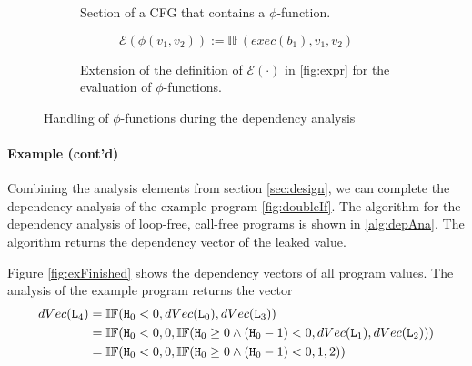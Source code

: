 \begin{figure}
\begin{subfigure}[t]{.4\textwidth}
    \centering
    \caption{Section of a CFG that contains a $\phi$-function.}
    \label{fig:phi}
\end{subfigure}
\hfill
\begin{subfigure}[t]{.5\textwidth}
    \begin{equation*}
\mathcal{E}(\phi(v_1, v_2)) := \mathbb{IF}(exec(b_1), v_1, v_2)
\end{equation*}
\caption{Extension of the definition of $\mathcal{E}(\cdot)$ in \ref{fig:expr} for the evaluation of $\phi$-functions.}\label{fig:exprPhi}
\end{subfigure}
\caption{Handling of $\phi$-functions during the dependency analysis}
\end{figure}

\paragraph{Example (cont'd)}
Combining the analysis elements from section \ref{sec:design}, we can complete the dependency analysis of the example program \ref{fig:doubleIf}. The algorithm for the dependency analysis of loop-free, call-free programs is shown in \ref{alg:depAna}. The algorithm returns the dependency vector of the leaked value.

Figure \ref{fig:exFinished} shows the dependency vectors of all program values. The analysis of the example program returns the vector
\begin{align*}
    dVec(\mathtt{L}_4) &= \mathbb{IF}(\mathtt{H}_0 < 0, dVec(\mathtt{L}_0), dVec(\mathtt{L}_3)) \\
    &= \mathbb{IF}(\mathtt{H}_0 < 0, 0, \mathbb{IF}(\mathtt{H}_0 \geq 0 \land (\mathtt{H}_0 - 1) < 0, dVec(\mathtt{L}_1), dVec(\mathtt{L}_2))) \\
    &= \mathbb{IF}(\mathtt{H}_0 < 0, 0, \mathbb{IF}(\mathtt{H}_0 \geq 0 \land (\mathtt{H}_0 - 1) < 0, 1, 2))
\end{align*}

